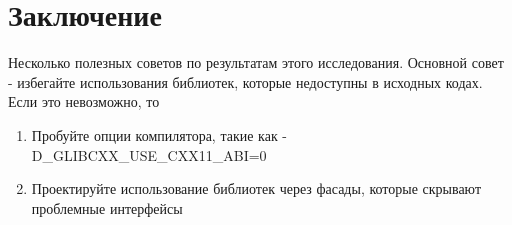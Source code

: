 \documentclass[14pt,a4paper]{article}
\begin{document}
\section*{Заключение}
Несколько полезных советов по результатам этого исследования. Основной
совет - избегайте использования библиотек, которые недоступны в
исходных кодах. Если это невозможно, то
\begin{enumerate}
\item Пробуйте опции компилятора, такие как
  -D\_GLIBCXX\_USE\_CXX11\_ABI=0
\item Проектируйте использование библиотек через фасады, которые
  скрывают проблемные интерфейсы
\end{enumerate}

\end{document}
